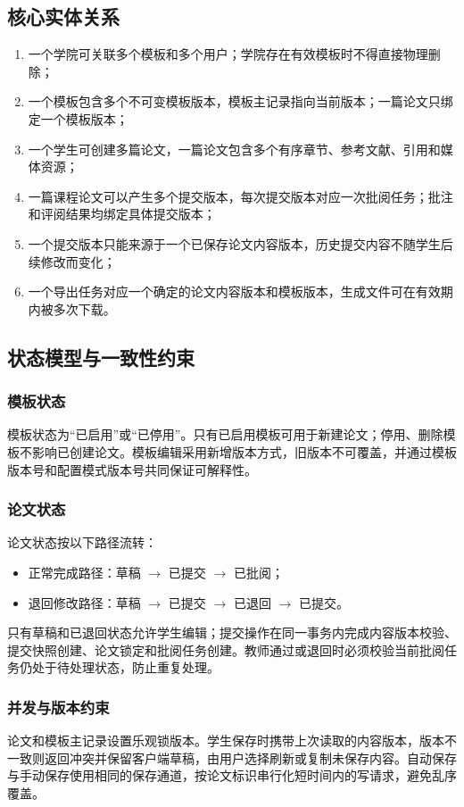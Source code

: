 \documentclass{../template/softeng}
\begin{document}
	\subsection{核心实体关系}
	\begin{enumerate}
		\item 一个学院可关联多个模板和多个用户；学院存在有效模板时不得直接物理删除；
		\item 一个模板包含多个不可变模板版本，模板主记录指向当前版本；一篇论文只绑定一个模板版本；
		\item 一个学生可创建多篇论文，一篇论文包含多个有序章节、参考文献、引用和媒体资源；
		\item 一篇课程论文可以产生多个提交版本，每次提交版本对应一次批阅任务；批注和评阅结果均绑定具体提交版本；
		\item 一个提交版本只能来源于一个已保存论文内容版本，历史提交内容不随学生后续修改而变化；
		\item 一个导出任务对应一个确定的论文内容版本和模板版本，生成文件可在有效期内被多次下载。
	\end{enumerate}
	
	\subsection{状态模型与一致性约束}
	\subsubsection{模板状态}
	模板状态为“已启用”或“已停用”。只有已启用模板可用于新建论文；停用、删除模板不影响已创建论文。模板编辑采用新增版本方式，旧版本不可覆盖，并通过模板版本号和配置模式版本号共同保证可解释性。
	
	\subsubsection{论文状态}
	论文状态按以下路径流转：
	\begin{itemize}
		\item 正常完成路径：草稿 $\rightarrow$ 已提交 $\rightarrow$ 已批阅；
		\item 退回修改路径：草稿 $\rightarrow$ 已提交 $\rightarrow$ 已退回 $\rightarrow$ 已提交。
	\end{itemize}
	只有草稿和已退回状态允许学生编辑；提交操作在同一事务内完成内容版本校验、提交快照创建、论文锁定和批阅任务创建。教师通过或退回时必须校验当前批阅任务仍处于待处理状态，防止重复处理。
	
	\subsubsection{并发与版本约束}
	论文和模板主记录设置乐观锁版本。学生保存时携带上次读取的内容版本，版本不一致则返回冲突并保留客户端草稿，由用户选择刷新或复制未保存内容。自动保存与手动保存使用相同的保存通道，按论文标识串行化短时间内的写请求，避免乱序覆盖。
	
\end{document}
